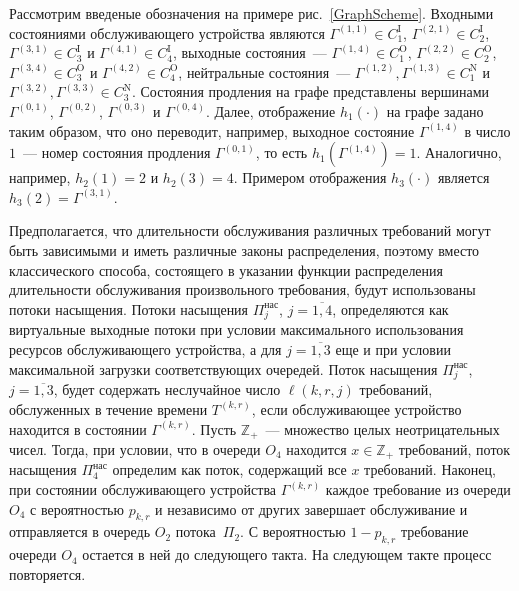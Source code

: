 \documentclass{report}
\begin{document}
Рассмотрим введеные обозначения на примере рис.~\ref{GraphScheme}. Входными состояниями обслуживающего устройства являются $\Gamma^{(1,1)} \in C_1^{\mathrm{I}}$, $\Gamma^{(2,1)} \in C_2^{\mathrm{I}}$, $\Gamma^{(3,1)} \in C_3^{\mathrm{I}}$ и $\Gamma^{(4,1)} \in C_4^{\mathrm{I}}$, выходные состояния~--- $\Gamma^{(1,4)} \in C_1^{\mathrm{O}}$, $\Gamma^{(2,2)} \in C_2^{\mathrm{O}}$, $\Gamma^{(3,4)} \in C_3^{\mathrm{O}}$ и $\Gamma^{(4,2)} \in C_4^{\mathrm{O}}$, нейтральные состояния~--- $\Gamma^{(1,2)}, \Gamma^{(1,3)} \in C_1^{\mathrm{N}}$ и $\Gamma^{(3,2)}, \Gamma^{(3,3)} \in C_3^{\mathrm{N}}$. Состояния продления на графе представлены вершинами $\Gamma^{(0,1)}$, $\Gamma^{(0,2)}$, $\Gamma^{(0,3)}$ и $\Gamma^{(0,4)}$. Далее, отображение $h_1(\cdot)$ на графе задано таким образом, что оно переводит, например, выходное состояние $\Gamma^{(1,4)}$ в число $1$~--- номер состояния продления $\Gamma^{(0,1)}$, то есть $h_1(\Gamma^{(1,4)})=1$. Аналогично, например, $h_2(1)=2$ и $h_2(3)=4$. Примером отображения $h_3(\cdot)$ является $h_3(2)=\Gamma^{(3,1)}$.


Предполагается, что длительности обслуживания различных требований могут быть зависимыми и иметь различные законы распределения, поэтому вместо классического способа, состоящего в указании функции распределения длительности обслуживания произвольного требования, будут использованы потоки насыщения. Потоки насыщения $\Pi^{\mathrm{\text{нас}}}_j$, $j=\overline{1,4}$, определяются как виртуальные выходные потоки при условии максимального использования ресурсов обслуживающего устройства, а для $j=\overline{1,3}$ еще и при условии максимальной загрузки соответствующих очередей. 
Поток насыщения $\Pi^{\mathrm{\text{нас}}}_j$, $j=\overline{1,3}$, будет содержать неслучайное число $\ell(k,r,j)$ требований, обслуженных в течение времени $T^{(k,r)}$, если обслуживающее устройство находится в состоянии $\Gamma^{(k,r)}$. Пусть $\mathbb{Z}_+$~--- множество целых неотрицательных чисел. Тогда, при условии, что в очереди $O_4$ находится $x \in \mathbb{Z}_+$ требований, поток насыщения $\Pi^{\mathrm{\text{нас}}}_4$ определим как поток, содержащий все $x$ требований.
Наконец, при состоянии обслуживающего устройства $\Gamma^{(k,r)}$ каждое требование из очереди $O_4$ с вероятностью $p_{k,r}$ и независимо от других завершает обслуживание и отправляется в очередь $O_2$ потока~$\Pi_2$. С вероятностью $1-p_{k,r}$ требование очереди $O_4$ остается в ней до следующего такта. На следующем такте процесс повторяется.
\end{document}
